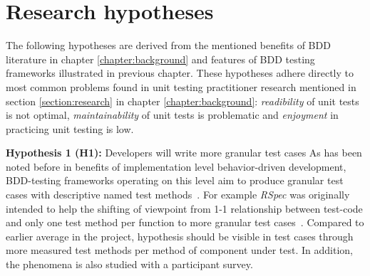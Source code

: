 \section{Research hypotheses}
    The following hypotheses are derived from the mentioned benefits of BDD literature in chapter \ref{chapter:background} and features of BDD
    testing frameworks illustrated in previous chapter. These hypotheses adhere directly to most common problems found in unit
    testing practitioner research mentioned in section \ref{section:research} in chapter \ref{chapter:background}:
    \textit{readibility} of unit tests is not optimal, \textit{maintainability} of unit tests is problematic and \textit{enjoyment}
    in practicing unit testing is low.
    \begin{addmargin}[0em]{0em}
    \vspace{10px}
    \textbf{Hypothesis 1 (H1):} Developers will write more granular test cases
    \vspace{5px}
    \newline
    As has been noted before in benefits of implementation level behavior-driven development, BDD-testing frameworks operating on this
    level aim to produce granular test cases with descriptive named test methods~\cite{chelimsky2010rspec, astels2006new, kapelonis2016java}.
    For example \textit{RSpec} was originally intended to help the shifting of viewpoint from 1-1 relationship between test-code
    and only one test method per function to more granular test cases~\cite{astels2006new}.
    Compared to earlier average in the project, hypothesis should be visible in test cases through more measured test methods
    per method of component under test. In addition, the phenomena is also studied with a participant survey.
    \end{addmargin}

